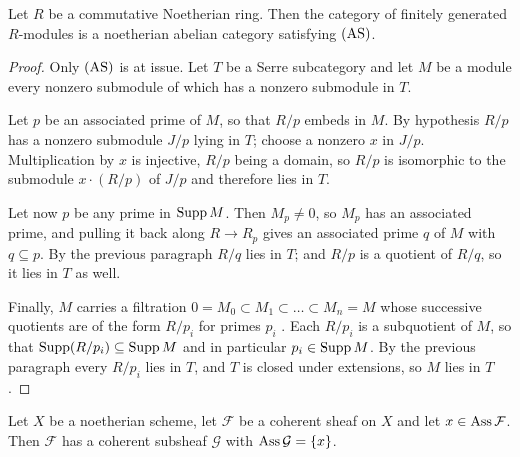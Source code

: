 \begin{proposition}
  \label{P:ModAS}   \leanok
  Let \(R\) be a commutative Noetherian ring. Then the category of finitely generated \(R\)-modules is a noetherian abelian category satisfying \(\textup{(AS)}\).
\end{proposition}

\begin{proof}
  \leanok
  Only \(\textup{(AS)}\) is at issue. Let \(T\) be a Serre subcategory and let \(M\) be a module every nonzero submodule of which has a nonzero submodule in \(T\).

	Let \(p\) be an associated prime of \(M\), so that \(R/p\) embeds in \(M\). By hypothesis \(R/p\) has a nonzero submodule \(J/p\) lying in \(T\); choose a nonzero \(x\) in \(J/p\). Multiplication by \(x\) is injective, \(R/p\) being a domain, so \(R/p\) is isomorphic to the submodule \(x\cdot(R/p)\) of \(J/p\) and therefore lies in \(T\).

	Let now \(p\) be any prime in \(\operatorname{Supp} M\). Then \(M_{p}\neq0\), so \(M_{p}\) has an associated prime, and pulling it back along \(R\to R_{p}\) gives an associated prime \(q\) of \(M\) with \(q\subseteq p\). By the previous paragraph \(R/q\) lies in \(T\); and \(R/p\) is a quotient of \(R/q\), so it lies in \(T\) as well.

	Finally, \(M\) carries a filtration \(0=M_{0}\subset M_{1}\subset\dots\subset M_{n}=M\) whose successive quotients are of the form \(R/p_{i}\) for primes \(p_{i}\) \cite[Theorem~6.4]{Mat89}. Each \(R/p_{i}\) is a subquotient of \(M\), so that \(\operatorname{Supp}(R/p_{i})\subseteq\operatorname{Supp} M\) and in particular \(p_{i}\in\operatorname{Supp} M\). By the previous paragraph every \(R/p_{i}\) lies in \(T\), and \(T\) is closed under extensions, so \(M\) lies in \(T\).
\end{proof}

\begin{lemma}
  \label{L:OneAss} 
  Let \(X\) be a noetherian scheme, let \(\mathcal{F}\) be a coherent sheaf on \(X\) and let \(x\in\operatorname{Ass}\mathcal{F}\). Then \(\mathcal{F}\) has a coherent subsheaf \(\mathcal{G}\) with \(\operatorname{Ass}\mathcal{G}=\{x\}\).
\end{lemma}

